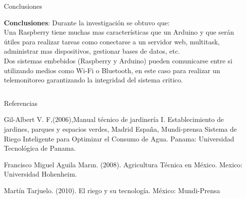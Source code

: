 \documentclass{beamer}
\begin{document}
\begin{frame}[fragile]{}
\begin{columns}[t]
	     \begin{column}{0.46\linewidth}
	     	\begin{block}{Conclusiones}\justifying
	     		\begin{minipage}[t]{0.96\textwidth}
	     			\textbf{Conclusiones}: 
	     			Durante la investigación se obtuvo que:\\
	     			Una Raspberry tiene muchas mas características que un Arduino y que serán útiles para realizar tareas como conectarse a un servidor web, multitask, administrar mas dispositivos, gestionar bases de datos, etc.
	     			\\
	     			Dos sistemas embebidos (Raspberry y Arduino) pueden comunicarse entre si utilizando medios como Wi-Fi o Bluetooth, en este caso para realizar un telemonitoreo garantizando la integridad del sistema critico.
	     			\\
	     			
	     		\end{minipage}
	     		
	     	\end{block}   
	     \end{column}
\end{columns}

\justifying
\begin{columns}[t]
 \begin{column}{0.96\linewidth}
      \begin{block}{Referencias}
	\begin{minipage}[t]{0.71\textwidth}
        \begin{small}
        \begin{thebibliography}{widestlabel}
        	 Gil-Albert V. F,(2006),Manual técnico de jardinería I. Establecimiento de jardines,
parques y espacios verdes, Madrid España, Mundi-prensa
        	 Sistema de Riego Inteligente para Optimizar el Consumo de
Agua. Panama: Universidad Tecnológica de Panama.

        	 Francisco Miguel Aguila Marın. (2008). Agricultura Técnica en México. Mexico: Universidad Hohenheim.
        	
        	
        	 Martín Tarjuelo. (2010). El riego y su tecnología. México: Mundi-Prensa
        	

\end{thebibliography}
\end{small}
\end{minipage}
\end{block}
\end{column}
\end{columns}
\end{frame}
\end{document}
